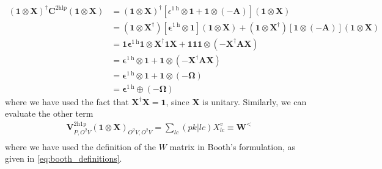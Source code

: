 \begin{align}
    \left( \bm{1} \otimes \bm{X } \right)^\dagger \bm{C}^{2 \mathrm{hlp}} \left( \bm{1} \otimes \bm{X } \right) &= \left( \bm{1} \otimes \bm{X } \right)^\dagger \left[\epsilon^{1 \mathrm{~h}} \otimes \bm{1} + \bm{1} \otimes (-\bm{A})\right] \left( \bm{1} \otimes \bm{X } \right) \\
&= \left( \bm{1} \otimes \bm{X }^\dagger \right) \left[\bm{\epsilon}^{1 \mathrm{~h}} \otimes \bm{1}\right] \left( \bm{1} \otimes \bm{X } \right) + \left( \bm{1} \otimes \bm{X }^\dagger \right) \left[\bm{1} \otimes (-\bm{A})\right] \left( \bm{1} \otimes \bm{X } \right)\\
&= \bm{1}\bm{\epsilon}^{1 \mathrm{~h}}\bm{1} \otimes \bm{X }^\dagger \bm{1} \bm{X } + \bm{1} \bm{1} \bm{1} \otimes (-\bm{X }^\dagger \bm{A} \bm{X }) \\
&= \bm{\epsilon}^{1 \mathrm{~h}} \otimes \bm{1} + \bm{1} \otimes (-\bm{X }^\dagger \bm{A} \bm{X }) \\
&= \bm{\epsilon}^{1 \mathrm{~h}} \otimes \bm{1} + \bm{1} \otimes (-\bm{\Omega }) \\
&= \bm{\epsilon}^{1 \mathrm{~h}} \oplus (-\bm{\Omega }) 
\end{align}
where we have used the fact that $\bm{X}^\dag \bm{X} = \bm{1}$, since $\bm{X}$ is unitary. Similarly, we can evaluate the other term
\begin{align}
    \bm{V}^{2 \mathrm{h1p}}_{P,O^2V}\left( \bm{1}\otimes \bm{X }\right)_{O^2V,O^2V} = \sum_{lc} (pk|lc) X_{lc}^{v} \equiv \bm{W}^< \\
\end{align}
where we have used the definition of the $W$ matrix in Booth's formulation, as given in \eqref{eq:booth_definitions}.
